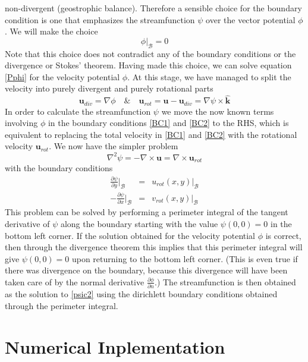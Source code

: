 \documentclass{article}
\begin{document}
non-divergent (geostrophic balance). Therefore a sensible choice for
the boundary condition is one that emphasizes the streamfunction
$\psi$ over the vector potential $\phi$. We will make the choice
\begin{equation} \phi|_{\mathcal{B}} = 0 \end{equation} Note that this
choice does not contradict any of the boundary conditions or the
divergence or Stokes' theorem. Having made this choice, we can solve
equation \eqref{Pphi} for the velocity potential $\phi$. At this
stage, we have managed to split the velocity into purely divergent and
purely rotational parts \begin{equation} \bm{u}_{div} = \nabla\phi
  \quad\&\quad \bm{u}_{rot} = \bm{u} - \bm{u}_{div} =
  \nabla\psi\times\bm{\hat{k}}\end{equation} In order to calculate the
streamfunction $\psi$ we move the now known terms involving $\phi$ in
the boundary conditions \eqref{BC1} and \eqref{BC2} to the RHS, which
is equivalent to replacing the total velocity in \eqref{BC1} and
\eqref{BC2} with the rotational velocity $\bm{u}_{rot}$. We now have
the simpler problem
\begin{equation}\label{psic2} \nabla^2 \psi = -\nabla\times\bm{u} =
  \nabla\times\bm{u}_{rot} \end{equation}
with the boundary conditions
\begin{eqnarray}
  \frac{\partial\psi}{\partial y}|_{\mathcal{B}} & = & u_{rot}(x,y)|_{\mathcal{B}}\label{BC3} \\
  -\frac{\partial\psi}{\partial x}|_{\mathcal{B}} & = & v_{rot}(x,y)|_{\mathcal{B}}\label{BC4}
\end{eqnarray}
This problem can be solved by performing a perimeter integral of the
tangent derivative of $\psi$ along the boundary starting with the
value $\psi(0,0)=0$ in the bottom left corner. If the solution
obtained for the velocity potential $\phi$ is correct, then through
the divergence theorem this implies that this perimeter integral will
give $\psi(0,0) = 0$ upon returning to the bottom left corner. (This
is even true if there was divergence on the boundary, because this
divergence will have been taken care of by the normal derivative
$\frac{\partial\phi}{\partial n}$.) The streamfunction is then
obtained as the solution to \eqref{psic2} using the dirichlett
boundary conditions obtained through the perimeter integral.

\section{Numerical Inplementation}
\end{document}
